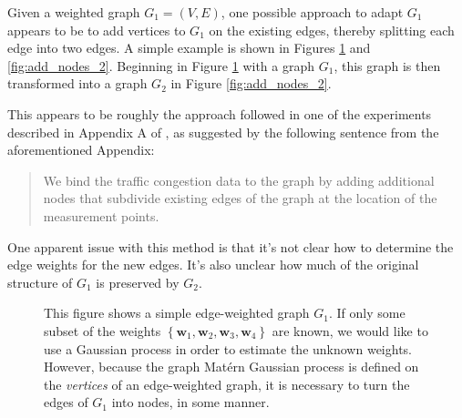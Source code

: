 Given a weighted graph $G_1 = (V, E)$, one possible approach to adapt $G_1$ appears to be to add vertices to $G_1$ on the existing edges, thereby splitting each edge into two edges. A simple example is shown in Figures \ref{fig:add_nodes_1} and \ref{fig:add_nodes_2}. Beginning in Figure \ref{fig:add_nodes_1} with a graph $G_1$, this graph is then transformed into a graph $G_2$ in Figure \ref{fig:add_nodes_2}.

This appears to be roughly the approach followed in one of the experiments described in Appendix A of \cite{pmlr-v130-borovitskiy21a}, as suggested by the following sentence from the aforementioned Appendix:

\begin{quote}
    We bind the traffic congestion data to the graph by adding additional nodes that subdivide existing edges of the graph at the location of the measurement points.
\end{quote}

One apparent issue with this method is that it's not clear how to determine the edge weights for the new edges. It's also unclear how much of the original structure of $G_1$ is preserved by $G_2$.

\begin{figure}
    \begin{center}
    \end{center}
    \caption{This figure shows a simple edge-weighted graph $G_1$. If only some subset of the weights $\left\{ \mathbf w_1, \mathbf w_2, \mathbf w_3, \mathbf w_4 \right\}$ are known, we would like to use a Gaussian process in order to estimate the unknown weights. However, because the graph Mat\'{e}rn Gaussian process is defined on the \textit{vertices} of an edge-weighted graph, it is necessary to turn the edges of $G_1$ into nodes, in some manner.}
    \label{fig:add_nodes_1}
\end{figure}

